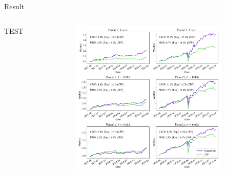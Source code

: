 \begin{frame}{Result}
\begin{columns}
\begin{column}{0.25\textwidth}
TEST
\end{column}
\begin{column}{0.75\textwidth}
\begin{center}
\includegraphics[height= 7.5cm]{images/crp_compare.png}
\end{center}
\end{column}
\end{columns}

\end{frame}
